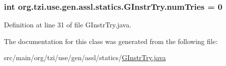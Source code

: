 \hypertarget{classorg_1_1tzi_1_1use_1_1gen_1_1assl_1_1statics_1_1_g_instr_try_ad71281ace40373d77f99659edce65236}{
\subsubsection[{num\-Tries}]{\setlength{\rightskip}{0pt plus 5cm}int org.\-tzi.\-use.\-gen.\-assl.\-statics.\-G\-Instr\-Try.\-num\-Tries = 0\hspace{0.3cm}{\ttfamily [static]}}}\label{classorg_1_1tzi_1_1use_1_1gen_1_1assl_1_1statics_1_1_g_instr_try_ad71281ace40373d77f99659edce65236}


Definition at line 31 of file G\-Instr\-Try.\-java.



The documentation for this class was generated from the following file\-:\begin{DoxyCompactItemize}
\item 
src/main/org/tzi/use/gen/assl/statics/\hyperlink{_g_instr_try_8java}{G\-Instr\-Try.\-java}\end{DoxyCompactItemize}

